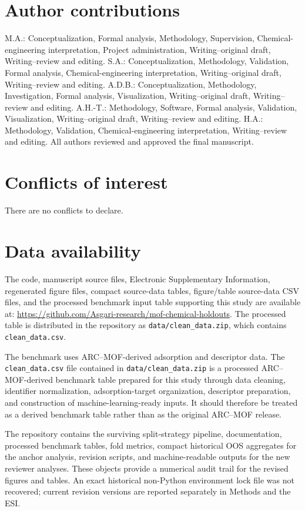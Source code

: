 \documentclass[11pt,a4paper]{article}
\begin{document}
\section*{Author contributions}
M.A.: Conceptualization, Formal analysis, Methodology, Supervision, Chemical-engineering interpretation, Project administration, Writing--original draft, Writing--review and editing. S.A.: Conceptualization, Methodology, Validation, Formal analysis, Chemical-engineering interpretation, Writing--original draft, Writing--review and editing. A.D.B.: Conceptualization, Methodology, Investigation, Formal analysis, Visualization, Writing--original draft, Writing--review and editing. A.H.-T.: Methodology, Software, Formal analysis, Validation, Visualization, Writing--original draft, Writing--review and editing. H.A.: Methodology, Validation, Chemical-engineering interpretation, Writing--review and editing. All authors reviewed and approved the final manuscript.

\section*{Conflicts of interest}
There are no conflicts to declare.

\section*{Data availability}
The code, manuscript source files, Electronic Supplementary Information, regenerated figure files, compact source-data tables, figure/table source-data CSV files, and the processed benchmark input table supporting this study are available at: \url{https://github.com/Asgari-research/mof-chemical-holdouts}. The processed table is distributed in the repository as \texttt{data/clean\_data.zip}, which contains \texttt{clean\_data.csv}.

The benchmark uses ARC--MOF-derived adsorption and descriptor data. The \texttt{clean\_data.csv} file contained in \texttt{data/clean\_data.zip} is a processed ARC--MOF-derived benchmark table prepared for this study through data cleaning, identifier normalization, adsorption-target organization, descriptor preparation, and construction of machine-learning-ready inputs. It should therefore be treated as a derived benchmark table rather than as the original ARC--MOF release.

The repository contains the surviving split-strategy pipeline, documentation, processed benchmark tables, fold metrics, compact historical OOS aggregates for the anchor analysis, revision scripts, and machine-readable outputs for the new reviewer analyses. These objects provide a numerical audit trail for the revised figures and tables. An exact historical non-Python environment lock file was not recovered; current revision versions are reported separately in Methods and the ESI.
\end{document}
